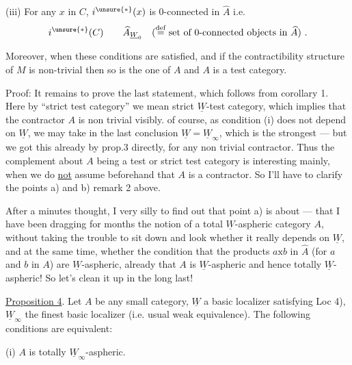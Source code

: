 (iii) For any $x$ in $C$, $i^{\unsure{*}}(x)$ is 0-connected in $\widehat A$ i.e.
\[
i^{\unsure{*}}(C)\qquad\widehat A_{\underline W_0}
\quad(\overset{\mathrm{def}}=\text{set of 0-connected objects in $\widehat A$})\ .
\]

Moreover, when these conditions are satisfied, 
and if the contractibility structure of $M$ is non-trivial
 
then so is the one of $A$ and $A$ is a  test category.

Proof:  It remains to prove the last statement, which follows
from corollary 1.
Here by ``strict test category'' we mean strict $\underline W$-test category,
which implies that the contractor $A$ is non trivial visibly.
 of course, as condition (i) does not depend on $\underline W$,
we may take in the last conclusion $\underline W=\underline W_\infty$,
which is the strongest --- but we got this already by prop.3 directly,
for any non trivial contractor. Thus the complement about $A$ being a test or
strict test category is interesting mainly, when we do \uline{not} assume
beforehand that $A$ is a contractor. So I'll have to clarify the points a) and b)
 remark 2 above.

After a minutes thought, I  very silly to find out that point a)
is about  --- that I have been dragging for months the notion
of a total $\underline W$-aspheric category $A$, without
 taking the trouble to sit down and look whether it really depends
on $\underline W$, and at the same time, whether the condition that the products
$a\mathbin{\mathrm{x}}b$ in $\widehat A$ (for $a$ and $b$ in $A$) are
$\underline W$-aspheric, already  that $A$ is
$\underline W$-aspheric and hence totally $\underline W$-aspheric!
So let's clean it up in the long last!

\uline{Proposition 4}. Let $A$ be any small category, $\underline W$ a basic
localizer satisfying Loc 4), $\underline W_\infty$ 
the finest basic localizer (i.e. usual weak equivalence).
The following conditions are equivalent:

(i) $A$ is totally $\underline W_\infty$-aspheric.

